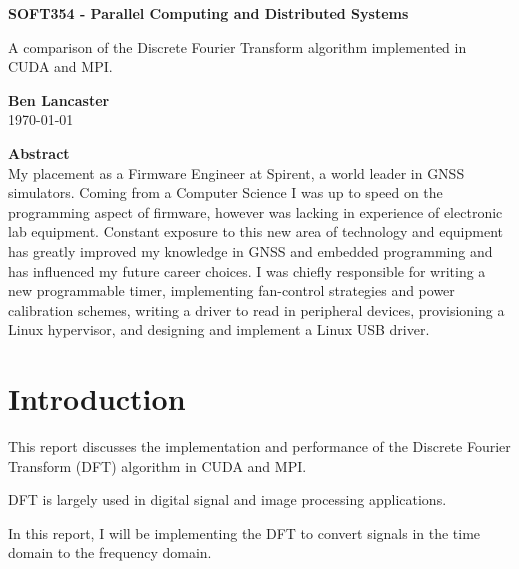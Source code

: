 \documentclass[8pt,a4paper]{article}
\begin{document}
\begin{titlepage}
\begin{center}

\vspace*{3cm}
\Large
\textbf{SOFT354 - Parallel Computing and Distributed Systems}

\vspace{0.4cm}
\large
A comparison of the Discrete Fourier Transform algorithm implemented in CUDA and MPI.

\vspace{4cm}
\textbf{Ben Lancaster}\\
\today

\vspace{4cm}
\textbf{Abstract}\\
\small
My placement as a Firmware Engineer at Spirent, a world leader in GNSS simulators. Coming from a Computer Science I was up to speed on the programming aspect of firmware, however was lacking in experience of electronic lab equipment. Constant exposure to this new area of technology and equipment has greatly improved my knowledge in GNSS and embedded programming and has influenced my future career choices. I was chiefly responsible for writing a new programmable timer, implementing fan-control strategies and power calibration schemes, writing a driver to read in peripheral devices, provisioning a Linux hypervisor, and designing and implement a Linux USB driver.

\end{center}

\end{titlepage}

\renewcommand*\contentsname{Table of Contents}
\tableofcontents
\newpage

\section{Introduction}
This report discusses the implementation and performance of the Discrete Fourier Transform (DFT) algorithm in CUDA and MPI.

DFT is largely used in digital signal and image processing applications. 

In this report, I will be implementing the DFT to convert signals in the time domain to the frequency domain.
\end{document}
